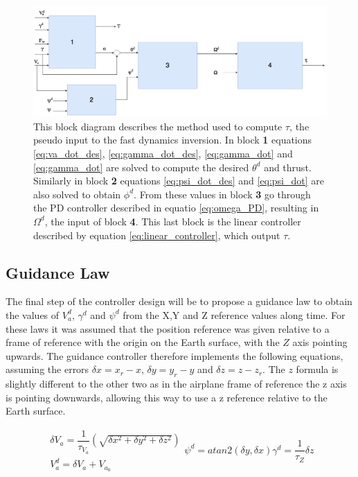 \begin{figure}[!htb]
  \centering
  \includegraphics[width=1\textwidth]{Figures/slow_inversion.png}
  \caption[Slow dynamics controller]{This block diagram describes the method used to compute $\tau$, the pseudo input to the fast dynamics inversion. In block \textbf{1} equations \ref{eq:va_dot_des}, \ref{eq:gamma_dot_des}, \ref{eq:gamma_dot} and \ref{eq:gamma_dot} are solved to compute the desired $\theta^d$ and thrust. Similarly in block \textbf{2} equations \ref{eq:psi_dot_des} and \ref{eq:psi_dot} are also solved to obtain $\phi^d$. From these values in block \textbf{3} go through the PD controller described in equatio \ref{eq:omega_PD}, resulting in $\Omega^d$, the input of block \textbf{4}. This last block is the linear controller described by equation \ref{eq:linear_controller}, which output $\tau$.}
  \label{fig:slow_inversion}
\end{figure}

\subsection{Guidance Law}

The final step of the controller design will be to propose a guidance law to obtain the values of $V_a^d$, $\gamma^d$ and $\psi^d$ from the X,Y and Z reference values along time. For these laws it was assumed that the position reference was given relative to a frame of reference with the origin on the Earth surface, with the $Z$ axis pointing upwards. The guidance controller therefore implements the following equations, assuming the errors $\delta x = x_r - x$, $\delta y = y_r - y$ and $\delta z = z - z_r$. The $z$ formula is slightly different to the other two as in the airplane frame of reference the z axis is pointing downwards, allowing this way to use a z reference relative to the Earth surface.

\begin{subequations}
	\begin{gather}
	\delta V_a = \dfrac{1}{\tau_{V_a}}(\sqrt{\delta x^2 + \delta y^2 + \delta z^2})\\
	V_a^d= \delta V_a  + V_{a_0}
	\end{gather}
	\begin{equation}
	\psi^d = atan2(\delta y,\delta x)
	\end{equation}
	\begin{equation}
	\gamma^d = \dfrac{1}{\tau_Z}\delta z
	\end{equation}
	\label{eq:guidance_law}
\end{subequations}

